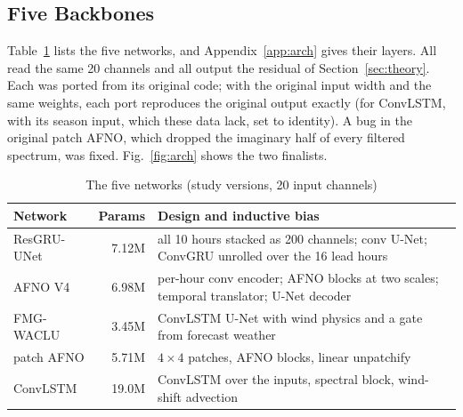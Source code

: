 \documentclass[journal]{IEEEtran}
\begin{document}
\subsection{Five Backbones}
\label{sec:arch}
Table~\ref{tab:models} lists the five networks, and Appendix~\ref{app:arch} gives their layers. All read the same 20 channels and all output the residual of Section~\ref{sec:theory}. Each was ported from its original code; with the original input width and the same weights, each port reproduces the original output exactly (for ConvLSTM, with its season input, which these data lack, set to identity). A bug in the original patch AFNO, which dropped the imaginary half of every filtered spectrum, was fixed. Fig.~\ref{fig:arch} shows the two finalists.

\begin{table}[!htb]
\centering
\caption{The five networks (study versions, 20 input channels)}
\label{tab:models}
\setlength{\tabcolsep}{3pt}
\begin{tabular}{@{}lrp{}@{}}
\toprule
Network & Params & Design and inductive bias \\
\midrule
ResGRU-UNet & 7.12M & all 10 hours stacked as 200 channels; conv U-Net; ConvGRU unrolled over the 16 lead hours \\
AFNO V4 & 6.98M & per-hour conv encoder; AFNO blocks at two scales; temporal translator; U-Net decoder \\
FMG-WACLU & 3.45M & ConvLSTM U-Net with wind physics and a gate from forecast weather \\
patch AFNO & 5.71M & $4\times4$ patches, AFNO blocks, linear unpatchify \\
ConvLSTM & 19.0M & ConvLSTM over the inputs, spectral block, wind-shift advection \\
\bottomrule
\end{tabular}
\end{table}
\end{document}
